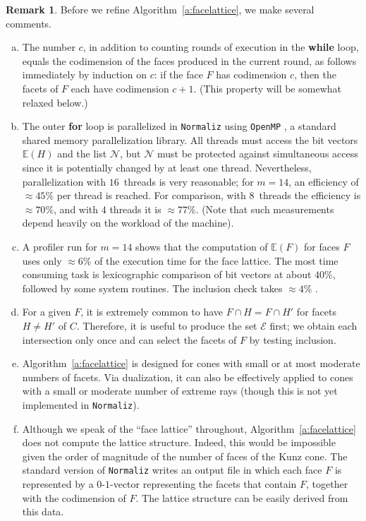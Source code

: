\documentclass[12pt]{amsart}
\theoremstyle{definition}
\newtheorem{remark}[thm]{Remark}
\numberwithin{equation}{section}
\renewcommand\>{\rangle}
\newcommand\<{\langle}
\newcommand\0{\mathbf{0}}
\def\EE{{\mathbb E}}
\def\cN{{\mathcal N}}
\def\cE{{\mathcal E}}
\begin{document}
\begin{remark}\label{r:facelatticealg}
Before we refine Algorithm~\ref{a:facelattice}, we make several comments.  
\begin{enumerate}[(a)]
\item 
The number $c$, in addition to counting rounds of execution in the \textbf{while} loop, equals the codimension of the faces produced in the current round, as follows immediately by induction on $c$: if the face $F$ has codimension $c$, then the facets of $F$ each have codimension $c+1$. (This property will be somewhat relaxed below.)

\item 
The outer \textbf{for} loop is parallelized in \texttt{Normaliz} using \texttt{OpenMP} \cite{openmp}, a standard shared memory parallelization library. All threads must access the bit vectors $\EE(H)$ and the list $\cN$, but $\cN$ must be protected against simultaneous access since it is potentially changed by at least one thread.  Nevertheless, parallelization with $16$~threads is very reasonable; for $m = 14$, an efficiency of $\approx 45\%$ per thread is reached.  For comparison, with $8$~threads the efficiency is $\approx 70\%$, and with $4$ threads it is $\approx 77\%$. (Note that such measurements depend heavily on the workload of the machine).  

\item 
A profiler run for $m = 14$ shows that the computation of $\EE(F)$ for faces $F$ uses only $\approx6\%$ of the execution time for the face lattice.  The most time consuming task is lexicographic comparison of bit vectors at about $40\%$, followed by some system routines. The inclusion check takes $\approx 4\%$ .  

\item 
For a given $F$, it is extremely common to have $F \cap H = F \cap H'$ for facets $H \neq H'$ of $C$.  Therefore, it is useful to produce the set $\cE$ first; we obtain each intersection only once and can select the facets of $F$ by testing inclusion. 

\item 
Algorithm~\ref{a:facelattice} is designed for cones with small or at most moderate numbers of facets. Via dualization, it can also be effectively applied to cones with a small or moderate number of extreme rays (though this is not yet implemented in \texttt{Normaliz}).

\item
Although we speak of the ``face lattice'' throughout, Algorithm~\ref{a:facelattice} does not compute the lattice structure. Indeed, this would be impossible given the order of magnitude of the number of faces of the Kunz cone.  The standard version of \texttt{Normaliz} writes an output file in which each face $F$ is represented by a $0$-$1$-vector representing the facets that contain $F$, together with the codimension of $F$. The lattice structure can be easily derived from this data.

\end{enumerate}
\end{remark}
\end{document}
